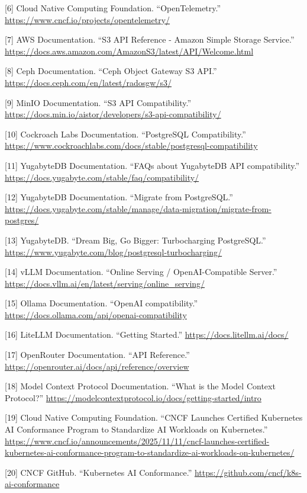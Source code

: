 \documentclass[11pt]{article}
\begin{document}
{[}6{]} Cloud Native Computing Foundation. ``OpenTelemetry.'' \url{https://www.cncf.io/projects/opentelemetry/}

{[}7{]} AWS Documentation. ``S3 API Reference - Amazon Simple Storage Service.'' \url{https://docs.aws.amazon.com/AmazonS3/latest/API/Welcome.html}

{[}8{]} Ceph Documentation. ``Ceph Object Gateway S3 API.'' \url{https://docs.ceph.com/en/latest/radosgw/s3/}

{[}9{]} MinIO Documentation. ``S3 API Compatibility.'' \url{https://docs.min.io/aistor/developers/s3-api-compatibility/}

{[}10{]} Cockroach Labs Documentation. ``PostgreSQL Compatibility.'' \url{https://www.cockroachlabs.com/docs/stable/postgresql-compatibility}

{[}11{]} YugabyteDB Documentation. ``FAQs about YugabyteDB API compatibility.'' \url{https://docs.yugabyte.com/stable/faq/compatibility/}

{[}12{]} YugabyteDB Documentation. ``Migrate from PostgreSQL.'' \url{https://docs.yugabyte.com/stable/manage/data-migration/migrate-from-postgres/}

{[}13{]} YugabyteDB. ``Dream Big, Go Bigger: Turbocharging PostgreSQL.'' \url{https://www.yugabyte.com/blog/postgresql-turbocharging/}

{[}14{]} vLLM Documentation. ``Online Serving / OpenAI-Compatible Server.'' \url{https://docs.vllm.ai/en/latest/serving/online_serving/}

{[}15{]} Ollama Documentation. ``OpenAI compatibility.'' \url{https://docs.ollama.com/api/openai-compatibility}

{[}16{]} LiteLLM Documentation. ``Getting Started.'' \url{https://docs.litellm.ai/docs/}

{[}17{]} OpenRouter Documentation. ``API Reference.'' \url{https://openrouter.ai/docs/api/reference/overview}

{[}18{]} Model Context Protocol Documentation. ``What is the Model Context Protocol?'' \url{https://modelcontextprotocol.io/docs/getting-started/intro}

{[}19{]} Cloud Native Computing Foundation. ``CNCF Launches Certified Kubernetes AI Conformance Program to Standardize AI Workloads on Kubernetes.'' \url{https://www.cncf.io/announcements/2025/11/11/cncf-launches-certified-kubernetes-ai-conformance-program-to-standardize-ai-workloads-on-kubernetes/}

{[}20{]} CNCF GitHub. ``Kubernetes AI Conformance.'' \url{https://github.com/cncf/k8s-ai-conformance}
\end{document}
